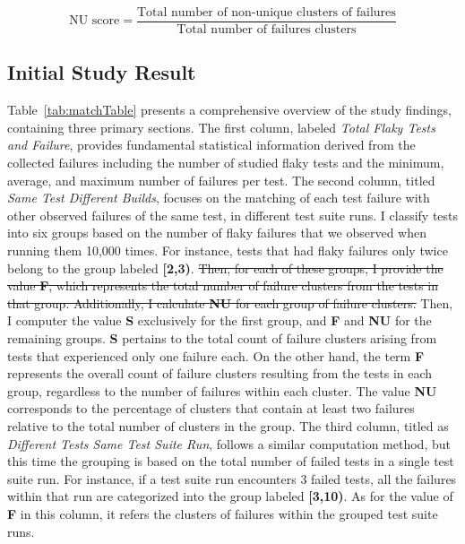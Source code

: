 \begin{equation}
    \label{ScoreEq}
  \text{NU score} = \frac{\text{Total number of non-unique clusters of failures}}{\text{Total number of failures clusters}}
\end{equation}




\subsection{Initial Study Result}

Table~\ref{tab:matchTable} presents a comprehensive overview of the study findings, containing three primary sections. The first column, labeled \emph{Total Flaky Tests and Failure}, provides fundamental statistical information derived from the collected failures including the number of studied flaky tests and the minimum, average, and maximum number of failures per test. 
The second column, titled \emph{Same Test Different Builds}, focuses on the matching of each test failure with other observed failures of the same test, in different test suite runs. 
I classify tests into six groups based on the number of flaky failures that we observed when running them 10,000 times.
For instance, tests that had flaky failures only twice belong to the group labeled \textbf{[2,3)}.
\sout{Then, for each of these groups, I provide the value \textbf{F}, which represents the total number of failure clusters from the tests in that group. Additionally, I calculate \textbf{NU} for each group of failure clusters.}
Then, I computer the value \textbf{S} exclusively for the first group, and \textbf{F} and \textbf{NU} for the remaining groups. \textbf{S} pertains to the total count of failure clusters arising from tests that experienced only one failure each. On the other hand, the term \textbf{F} represents the overall count of failure clusters resulting from the tests in each group, regardless to the number of failures within each cluster. The value \textbf{NU} corresponds to the percentage of clusters that contain at least two failures relative to the total number of clusters in the group.
The third column, titled as \emph{Different Tests Same Test Suite Run}, follows a similar computation method, but this time the grouping is based on the total number of failed tests in a single test suite run. For instance, if a test suite run encounters 3 failed tests, all the failures within that run are categorized into the group labeled \textbf{[3,10)}. As for the value of \textbf{F} in this column, it refers the clusters of failures within the grouped test suite runs.

